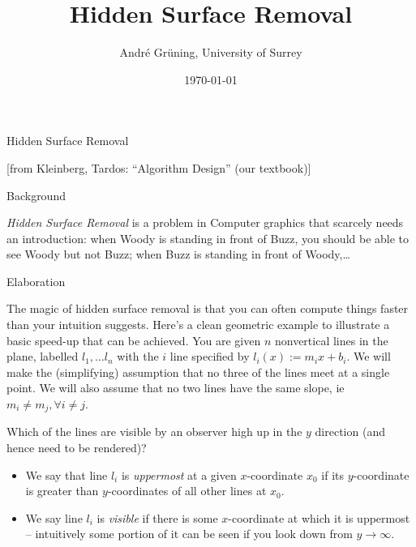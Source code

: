 \documentclass{article}
\title{Hidden Surface Removal}
\author{André Grüning, University of Surrey}
\date{\today}
\providecommand{\tightlist}{%
  \setlength{\itemsep}{0pt}\setlength{\parskip}{0pt}}
\begin{document}
\frame{\titlepage}

\begin{frame}{Hidden Surface Removal}

{[}from Kleinberg, Tardos: ``Algorithm Design'' (our textbook){]}

\begin{block}{Background}

\emph{Hidden Surface Removal} is a problem in Computer graphics that
scarcely needs an introduction: when Woody is standing in front of Buzz,
you should be able to see Woody but not Buzz; when Buzz is standing in
front of Woody,\dots 

\end{block}

\end{frame}

\begin{frame}

\begin{block}{Elaboration}

The magic of hidden surface removal is that you can often compute things
faster than your intuition suggests. Here's a clean geometric example to
illustrate a basic speed-up that can be achieved. You are given \(n\)
nonvertical lines in the plane, labelled \(l_1, \dots l_n\) with the
\(i\) line specified by \(l_i(x) := m_ix + b_i\). We will make the
(simplifying) assumption that no three of the lines meet at a single
point. We will also assume that no two lines have the same slope, ie $m_i \neq m_j, \forall i\neq j$.

Which of the lines are visible by an observer high up in the \(y\)
direction (and hence need to be rendered)?

\begin{itemize}[<+->]
\tightlist
\item
  We say that line \(l_i\) is \emph{uppermost} at a given
  \(x\)-coordinate \(x_0\) if its \(y\)-coordinate is greater than
  \(y\)-coordinates of all other lines at \(x_0\).
\item
  We say line \(l_i\) is \emph{visible} if there is some
  \(x\)-coordinate at which it is uppermost -- intuitively some portion
  of it can be seen if you look down from \(y \to \infty\).
\end{itemize}

\end{block}

\end{frame}
\end{document}
